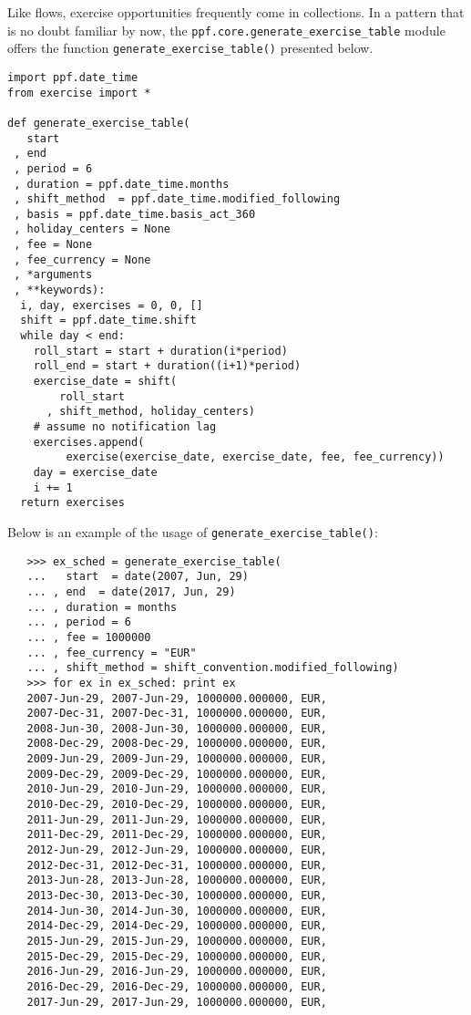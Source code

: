 Like flows, exercise opportunities frequently come in collections. In
a pattern that is no doubt familiar by now, the
\verb|ppf.core.generate_exercise_table| module offers the function
\verb|generate_exercise_table()| presented below.
\begin{verbatim}
import ppf.date_time
from exercise import *

def generate_exercise_table(
   start
 , end
 , period = 6
 , duration = ppf.date_time.months
 , shift_method  = ppf.date_time.modified_following
 , basis = ppf.date_time.basis_act_360
 , holiday_centers = None
 , fee = None 
 , fee_currency = None
 , *arguments
 , **keywords):
  i, day, exercises = 0, 0, []
  shift = ppf.date_time.shift
  while day < end:
    roll_start = start + duration(i*period)
    roll_end = start + duration((i+1)*period)
    exercise_date = shift(
        roll_start
      , shift_method, holiday_centers)
    # assume no notification lag
    exercises.append(
         exercise(exercise_date, exercise_date, fee, fee_currency))  
    day = exercise_date
    i += 1
  return exercises
\end{verbatim}
Below is an example of the usage of \verb|generate_exercise_table()|:
\begin{verbatim}
   >>> ex_sched = generate_exercise_table(
   ...   start  = date(2007, Jun, 29)
   ... , end  = date(2017, Jun, 29)
   ... , duration = months
   ... , period = 6
   ... , fee = 1000000
   ... , fee_currency = "EUR"
   ... , shift_method = shift_convention.modified_following)
   >>> for ex in ex_sched: print ex
   2007-Jun-29, 2007-Jun-29, 1000000.000000, EUR, 
   2007-Dec-31, 2007-Dec-31, 1000000.000000, EUR, 
   2008-Jun-30, 2008-Jun-30, 1000000.000000, EUR, 
   2008-Dec-29, 2008-Dec-29, 1000000.000000, EUR, 
   2009-Jun-29, 2009-Jun-29, 1000000.000000, EUR, 
   2009-Dec-29, 2009-Dec-29, 1000000.000000, EUR, 
   2010-Jun-29, 2010-Jun-29, 1000000.000000, EUR, 
   2010-Dec-29, 2010-Dec-29, 1000000.000000, EUR, 
   2011-Jun-29, 2011-Jun-29, 1000000.000000, EUR, 
   2011-Dec-29, 2011-Dec-29, 1000000.000000, EUR, 
   2012-Jun-29, 2012-Jun-29, 1000000.000000, EUR, 
   2012-Dec-31, 2012-Dec-31, 1000000.000000, EUR, 
   2013-Jun-28, 2013-Jun-28, 1000000.000000, EUR, 
   2013-Dec-30, 2013-Dec-30, 1000000.000000, EUR, 
   2014-Jun-30, 2014-Jun-30, 1000000.000000, EUR, 
   2014-Dec-29, 2014-Dec-29, 1000000.000000, EUR, 
   2015-Jun-29, 2015-Jun-29, 1000000.000000, EUR, 
   2015-Dec-29, 2015-Dec-29, 1000000.000000, EUR, 
   2016-Jun-29, 2016-Jun-29, 1000000.000000, EUR, 
   2016-Dec-29, 2016-Dec-29, 1000000.000000, EUR, 
   2017-Jun-29, 2017-Jun-29, 1000000.000000, EUR, 
\end{verbatim}

